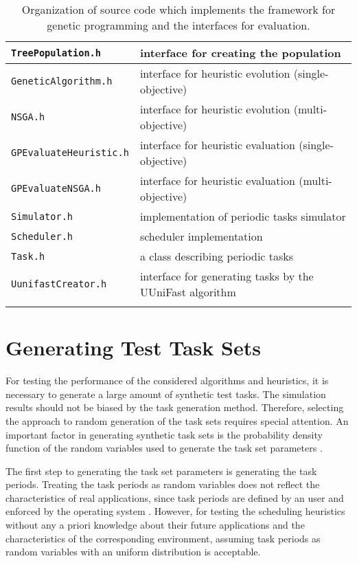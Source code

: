 \begin{longtable}{| p{} | p{} |}
\texttt{TreePopulation.h} & interface for creating the population \\ \hline
\texttt{GeneticAlgorithm.h} & interface for heuristic evolution (single-objective) \\ \hline
\texttt{NSGA.h} & interface for heuristic evolution (multi-objective) \\ \hline
\texttt{GPEvaluateHeuristic.h} & interface for heuristic evaluation (single-objective) \\ \hline
\texttt{GPEvaluateNSGA.h} & interface for heuristic evaluation (multi-objective) \\ \hline
\texttt{Simulator.h} & implementation of periodic tasks simulator \\ \hline
\texttt{Scheduler.h} & scheduler implementation \\ \hline
\texttt{Task.h} & a class describing periodic tasks \\ \hline
\texttt{UunifastCreator.h} & interface for generating tasks by the UUniFast algorithm \\ \hline
\caption{Organization of source code which implements the framework for genetic programming and the interfaces for evaluation.}
\label{code_org}
\end{longtable}

\section{Generating Test Task Sets}
For testing the performance of the considered algorithms and heuristics, it is necessary to generate a large amount of synthetic test tasks.
The simulation results should not be biased by the task generation method.
Therefore, selecting the approach to random generation of the task sets requires special attention.
An important factor in generating synthetic task sets is the probability density function of the random variables used to generate the task set parameters \cite{bini2005measuring}.

The first step to generating the task set parameters is generating the task periods.
Treating the task periods as random variables does not reflect the characteristics of real applications, since task periods are defined by an user and enforced by the operating system \cite{bini2005measuring}.
However, for testing the scheduling heuristics without any a priori knowledge about their future applications and the characteristics of the corresponding environment, assuming task periods as random variables with an uniform distribution is acceptable.

